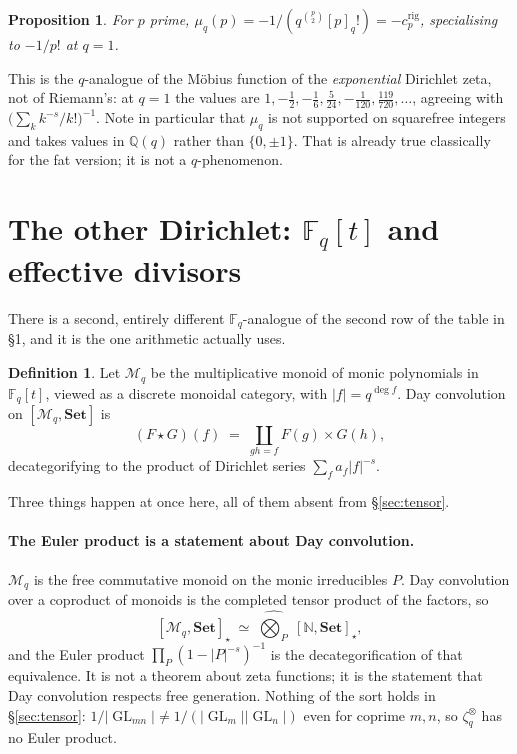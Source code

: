 \documentclass[11pt,a4paper]{article}
\newtheorem{proposition}[theorem]{Proposition}
\theoremstyle{definition}
\newtheorem{definition}[theorem]{Definition}
\theoremstyle{remark}
\newcommand{\FF}{\mathbb{F}}
\newcommand{\NN}{\mathbb{N}}
\newcommand{\QQ}{\mathbb{Q}}
\newcommand{\cat}[1]{\mathbf{#1}}
\newcommand{\Set}{\cat{Set}}
\DeclareMathOperator{\GL}{GL}
\newcommand{\norm}[1]{\lvert #1 \rvert}
\begin{document}
\begin{proposition}
For $p$ prime, $\mu_q(p) = -1/(q^{\binom p2}[p]_q!) = -c^{\mathrm{rig}}_p$, specialising to
$-1/p!$ at $q=1$.
\end{proposition}

\noindent
This is the $q$-analogue of the M\"obius function of the \emph{exponential} Dirichlet
zeta, not of Riemann's: at $q=1$ the values are $1, -\frac12, -\frac16, \frac5{24},
-\frac1{120}, \frac{119}{720}, \dots$, agreeing with $\bigl(\sum_k k^{-s}/k!\bigr)^{-1}$.
Note in particular that $\mu_q$ is not supported on squarefree integers and takes values
in $\QQ(q)$ rather than $\{0,\pm1\}$. That is already true classically for the fat
version; it is not a $q$-phenomenon.

\section{The other Dirichlet: \texorpdfstring{$\FF_q[t]$}{Fq[t]} and effective divisors}
\label{sec:functionfield}

There is a second, entirely different $\FF_q$-analogue of the second row of the table in
\S1, and it is the one arithmetic actually uses.

\begin{definition}
Let $\mathcal{M}_q$ be the multiplicative monoid of monic polynomials in $\FF_q[t]$,
viewed as a discrete monoidal category, with $\norm{f} = q^{\deg f}$. Day convolution on
$[\mathcal{M}_q, \Set]$ is
\[
  (F \star G)(f) \;=\; \coprod_{gh = f} F(g) \times G(h),
\]
decategorifying to the product of Dirichlet series $\sum_f a_f \norm{f}^{-s}$.
\end{definition}

Three things happen at once here, all of them absent from \S\ref{sec:tensor}.

\paragraph{The Euler product is a statement about Day convolution.}
$\mathcal{M}_q$ is the free commutative monoid on the monic irreducibles $P$. Day
convolution over a coproduct of monoids is the completed tensor product of the factors, so
\[
  [\mathcal{M}_q,\Set]_\star \;\simeq\; \widehat{\bigotimes_{P}}\; [\NN,\Set]_\star ,
\]
and the Euler product $\prod_P (1-\norm{P}^{-s})^{-1}$ is the decategorification of that
equivalence. It is not a theorem about zeta functions; it is the statement that Day
convolution respects free generation. Nothing of the sort holds in
\S\ref{sec:tensor}: $1/\norm{\GL_{mn}} \neq 1/(\norm{\GL_m}\norm{\GL_n})$ even for coprime
$m,n$, so $\zeta_q^{\otimes}$ has no Euler product.
\end{document}
